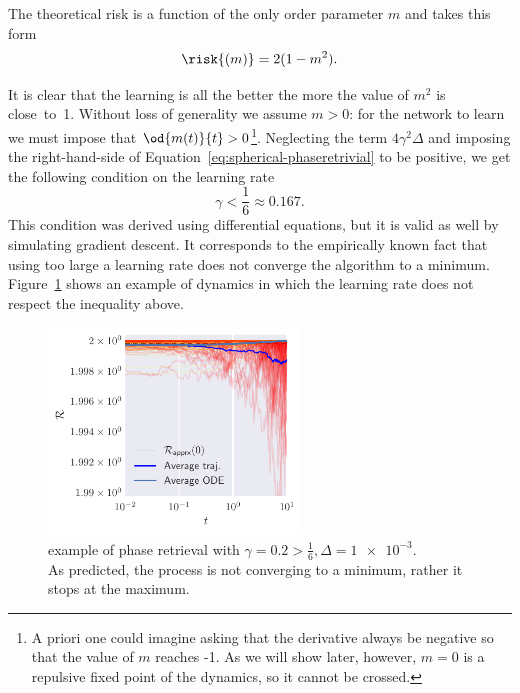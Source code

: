 The theoretical risk is a function of the only order parameter \(m\) and takes this form
\[
  \risk{(m)} = 2(1-m^2).
\]

It is clear that the learning is all the better the more the value of \(m^2\) is close~to~1.
Without loss of generality we assume \(m>0\): for the network to learn we must impose that \(\od{m{(t)}}{t}>0\)\footnote{
  A priori one could imagine asking that the derivative always be negative so that the value of \(m\) reaches -1.
  As we will show later, however, \(m=0\) is a repulsive fixed point of the dynamics, so it cannot be crossed.
}.
Neglecting the term \(4\gamma^2\Delta\) and imposing the right-hand-side of Equation~\eqref{eq:spherical-phaseretrivial} to be positive,
we get the following condition on the learning rate
\[\gamma<\frac16 \approx \num{0.167}.\]
This condition was derived using differential equations, but it is valid as well by simulating gradient descent.
It corresponds to the empirically known fact that using too large a learning rate does not converge the algorithm to a minimum.
Figure~\ref{fig:example-spherical-not-converging} shows an example of dynamics in which the learning rate does not respect the inequality above.
\begin{figure}
  \centering
  \includegraphics[width=0.6\textwidth]{figures/spherical/not-converging-phase-retrivial.pdf}
  \caption{
    example of phase retrieval with \(\gamma=0.2>\frac16, \Delta=\num{1e-3}\).\\
    As predicted, the process is not converging to a minimum, rather it stops at the maximum.
  }
  \label{fig:example-spherical-not-converging}
\end{figure}

